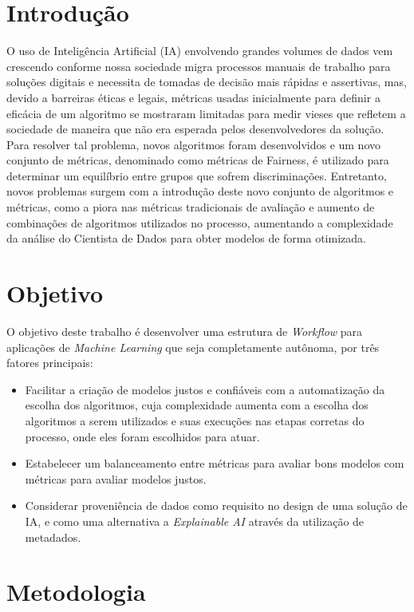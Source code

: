\documentclass[posterIC]{a0poster}
\begin{document}
\begin{multicols}{2}
\section{Introdução}

O uso de Inteligência Artificial (IA) envolvendo grandes volumes de dados vem crescendo conforme nossa sociedade migra processos manuais de trabalho para soluções digitais e necessita de tomadas de decisão mais rápidas e assertivas, mas, devido a barreiras éticas e legais, métricas usadas inicialmente para definir a eficácia de um algoritmo se mostraram limitadas para medir vieses que refletem a sociedade de maneira que não era esperada pelos desenvolvedores da solução. Para resolver tal problema, novos algoritmos foram desenvolvidos e um novo conjunto de métricas, denominado como métricas de Fairness, é utilizado para determinar um equilíbrio entre grupos que sofrem discriminações. Entretanto, novos problemas surgem com a introdução deste novo conjunto de algoritmos e métricas, como a piora nas métricas tradicionais de avaliação e aumento de combinações de algoritmos utilizados no processo, aumentando a complexidade da análise do Cientista de Dados para obter modelos de forma otimizada.

\section{Objetivo}

O objetivo deste trabalho é desenvolver uma estrutura de \textit{Workflow} para aplicações de \textit{Machine Learning} que seja completamente autônoma, por três fatores principais:

\begin{itemize}
\item Facilitar a criação de modelos justos e confiáveis com a automatização da escolha dos algoritmos, cuja complexidade aumenta com a escolha dos algoritmos a serem utilizados e suas execuções nas etapas corretas do processo, onde eles foram escolhidos para atuar.
\item Estabelecer um balanceamento entre métricas para avaliar bons modelos com métricas para avaliar modelos justos.
\item Considerar proveniência de dados como requisito no design de uma solução de IA, e como uma alternativa a \textit{Explainable AI} através da utilização de metadados.
\end{itemize}

\section{Metodologia}


\end{multicols}
\end{document}
